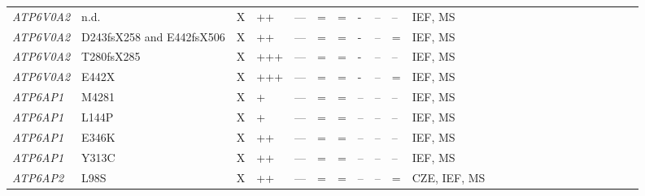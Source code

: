 \begin{landscape}
\begin{longtable}[c]{C{1.2cm}C{2cm}C{0.5cm}C{1.5cm}C{1.5cm}C{0.5cm}C{0.5cm}C{0.5cm}C{0.5cm}C{1.5cm}C{1.5cm}C{1.5cm}c c c c c c c c c c c c}
        \emph{ATP6V0A2} & n.d. & X                       & ++                                     & ---                                 & =   & =      & -   & --  & --                                  & IEF, MS                       & \cite{kornak_impaired_2008,morava_defective_2005} \\
        \emph{ATP6V0A2} & D243fsX258 and E442fsX506 & X                       & ++                                     & ---                                 & =   & =      & -   & --  & =                                  & IEF, MS                       & \cite{kornak_impaired_2008} \\
        \emph{ATP6V0A2} & T280fsX285 & X                       & +++                                      & ---                                 & =   & =      & -   & --  & --                                  & IEF, MS                       & \cite{kornak_impaired_2008} \\
        \emph{ATP6V0A2} & E442X & X                       & +++                                      & ---                                 & =   & =      & -   & --  & =                                  & IEF, MS                       & \cite{kornak_impaired_2008} \\
        \emph{ATP6AP1} & M4281 & X                       & +                                      & ---                                 & =   & =      & --   & --  & --                                  & IEF, MS                       & \cite{jansen_atp6ap1_2016} \\
        \emph{ATP6AP1} & L144P & X                       & +                                      & ---                                 & =   & =      & --   & --  & --                                  & IEF, MS                       & \cite{jansen_atp6ap1_2016} \\
        \emph{ATP6AP1} & E346K & X                       & ++                                      & ---                                 & =   & =      & --   & --  & --                                  & IEF, MS                       & \cite{jansen_atp6ap1_2016} \\
        \emph{ATP6AP1} & Y313C & X                       & ++                                      & ---                                 & =   & =      & --   & --  & --                                  & IEF, MS                       & \cite{jansen_atp6ap1_2016} \\
        \emph{ATP6AP2} & L98S & X                       & ++                                      & ---                                 & =   & =      & --   & --  & =                                  & CZE, IEF, MS                       & \cite{rujano_mutations_2017} \\

\end{longtable}
\end{landscape}
